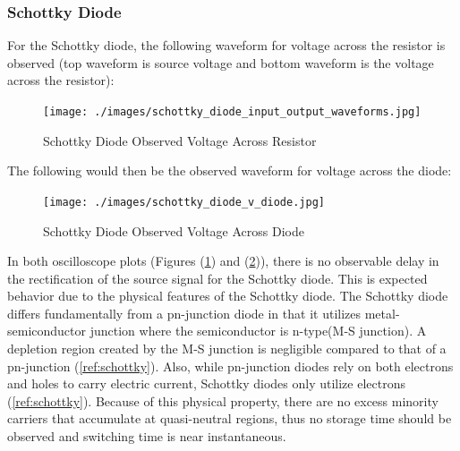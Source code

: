 \subsubsection{Schottky Diode}
For the Schottky diode, the following waveform for voltage across the resistor is observed (top waveform is source voltage and bottom waveform is the voltage across the resistor):
\FloatBarrier
\begin{figure}[h!]
	\centering
	\texttt{[image: ./images/schottky\_diode\_input\_output\_waveforms.jpg]}
	\caption{Schottky Diode Observed Voltage Across Resistor}
	\label{fig:schottky_vr}
\end{figure}
\FloatBarrier
The following would then be the observed waveform for voltage across the diode:
\FloatBarrier
\begin{figure}[h!]
	\centering
	\texttt{[image: ./images/schottky\_diode\_v\_diode.jpg]}
	\caption{Schottky Diode Observed Voltage Across Diode}
	\label{fig:schottky_vd}
\end{figure}
\FloatBarrier
In both oscilloscope plots (Figures (\ref{fig:schottky_vr}) and (\ref{fig:schottky_vd})), there is no observable delay in the rectification of the source signal for the Schottky diode. This is expected behavior due to the physical features of the Schottky diode. The Schottky diode differs fundamentally from a pn-junction diode in that it utilizes metal-semiconductor junction where the semiconductor is n-type(M-S junction). A depletion region created by the M-S junction is negligible compared to that of a pn-junction (\ref{ref:schottky}). Also, while pn-junction diodes rely on both electrons and holes to carry electric current, Schottky diodes only utilize electrons (\ref{ref:schottky}). Because of this physical property, there are no excess minority carriers that accumulate at quasi-neutral regions, thus no storage time should be observed and switching time is near instantaneous.